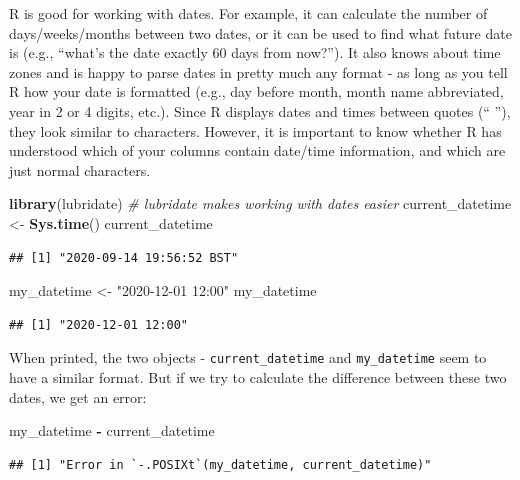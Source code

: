 \documentclass[
  12pt,
  krantz2]{krantz}
\makeatletter
\newenvironment{Shaded}{\begin{snugshade}}{\end{snugshade}}
\newcommand{\CommentTok}[1]{\textcolor[rgb]{0.56,0.35,0.01}{\textit{#1}}}
\newcommand{\KeywordTok}[1]{\textcolor[rgb]{0.13,0.29,0.53}{\textbf{#1}}}
\newcommand{\NormalTok}[1]{#1}
\newcommand{\OperatorTok}[1]{\textcolor[rgb]{0.81,0.36,0.00}{\textbf{#1}}}
\newcommand{\StringTok}[1]{\textcolor[rgb]{0.31,0.60,0.02}{#1}}
\newenvironment{kframe}{%
\medskip{}
\setlength{\fboxsep}{.8em}
 \def\at@end@of@kframe{}%
 \ifinner\ifhmode%
  \def\at@end@of@kframe{\end{minipage}}%
  \begin{minipage}{\columnwidth}%
 \fi\fi%
 \def\FrameCommand##1{\hskip\@totalleftmargin \hskip-\fboxsep
 \colorbox{shadecolor}{##1}\hskip-\fboxsep
     \hskip-\linewidth \hskip-\@totalleftmargin \hskip\columnwidth}%
 \MakeFramed {\advance\hsize-\width
   \@totalleftmargin\z@ \linewidth\hsize
   \@setminipage}}%
 {\par\unskip\endMakeFramed%
 \at@end@of@kframe}
\renewenvironment{Shaded}{\begin{kframe}}{\end{kframe}}
\makeatother
\begin{document}
R is good for working with dates.
For example, it can calculate the number of days/weeks/months between two dates, or it can be used to find what future date is (e.g., ``what's the date exactly 60 days from now?'').
It also knows about time zones and is happy to parse dates in pretty much any format - as long as you tell R how your date is formatted (e.g., day before month, month name abbreviated, year in 2 or 4 digits, etc.).
Since R displays dates and times between quotes (`` ''), they look similar to characters.
However, it is important to know whether R has understood which of your columns contain date/time information, and which are just normal characters.

\begin{Shaded}
\begin{Highlighting}[]
\KeywordTok{library}\NormalTok{(lubridate) }\CommentTok{# lubridate makes working with dates easier}
\NormalTok{current_datetime <-}\StringTok{ }\KeywordTok{Sys.time}\NormalTok{()}
\NormalTok{current_datetime}
\end{Highlighting}
\end{Shaded}

\begin{verbatim}
## [1] "2020-09-14 19:56:52 BST"
\end{verbatim}

\begin{Shaded}
\begin{Highlighting}[]
\NormalTok{my_datetime <-}\StringTok{ "2020-12-01 12:00"}
\NormalTok{my_datetime}
\end{Highlighting}
\end{Shaded}

\begin{verbatim}
## [1] "2020-12-01 12:00"
\end{verbatim}

When printed, the two objects - \texttt{current\_datetime} and \texttt{my\_datetime} seem to have a similar format.
But if we try to calculate the difference between these two dates, we get an error:

\begin{Shaded}
\begin{Highlighting}[]
\NormalTok{my_datetime }\OperatorTok{-}\StringTok{ }\NormalTok{current_datetime}
\end{Highlighting}
\end{Shaded}

\begin{verbatim}
## [1] "Error in `-.POSIXt`(my_datetime, current_datetime)"
\end{verbatim}
\end{document}
